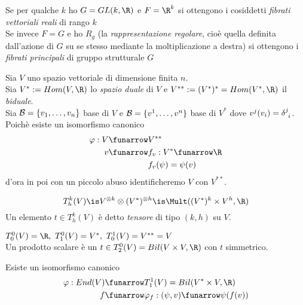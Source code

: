\begin{defn}
	Se per qualche $k$ ho $G = GL(k,\R)$ e $F = \R^k$ si ottengono i cosiddetti \emph{fibrati vettoriali reali} di rango $k$\\
	Se invece $F = G$ e ho $R_g$ (la \emph{rappresentazione regolare}, cioè quella definita dall'azione di $G$ su se stesso mediante la moltiplicazione a destra) si ottengono i \emph{fibrati principali} di gruppo strutturale $G$
\end{defn}


Sia $V$ uno spazio vettoriale di dimensione finita $n$. \\
Sia $V^* := Hom(V,\R)$ lo \emph{spazio duale} di $V$ e $V^{**} :=(V^*)^* = Hom(V^*,\R)$ il \emph{biduale}.\\
Sia $\mathcal{B} = \{v_1, \dots, v_n \}$ base di $V$ e $\mathcal{B} = \{ v^1, \dots, v^n \}$ base di $V^*$ dove $v^j(v_i) = \delta^j_{\hphantom{j}i}$.\\
Poichè esiste un isomorfismo canonico
\begin{align*}
	\varphi: V \funarrow &V^{**} \\
		     v \funarrow &f_v: V^* \funarrow \R \\
		                 &f_v(\psi) = \psi(v)
\end{align*}
d'ora in poi con un piccolo abuso identificheremo $V$ con $V^{**}$.

\begin{defn}[tensori]
	\[ T_h^k(V) \is V^{\otimes k} \otimes (V^*)^{\otimes h} \is \Mult( (V^*)^k \times V^h, \R) \] Un elemento $t \in T_h^k(V)$ è detto \emph{tensore} di tipo $(k,h)$ su $V$.
\end{defn}

\begin{oss}[esempi]
	$ T_0^0(V) = \R, \ T_1^0(V) = V^*, \ T_0^1(V) = V^{**} = V $ \\
	Un prodotto scalare è un $t \in T_2^0(V) = Bil(V \times V, \R)$ con $t$ simmetrico.
\end{oss}

\begin{oss}
	Esiste un isomorfismo canonico
\begin{align*}
	\varphi: End(V) \funarrow &T_1^1(V) = Bil(V^* \times V, \R) \\
				  f \funarrow &\varphi_f : (\psi,v) \funarrow \psi(f(v))
\end{align*}
\end{oss}

